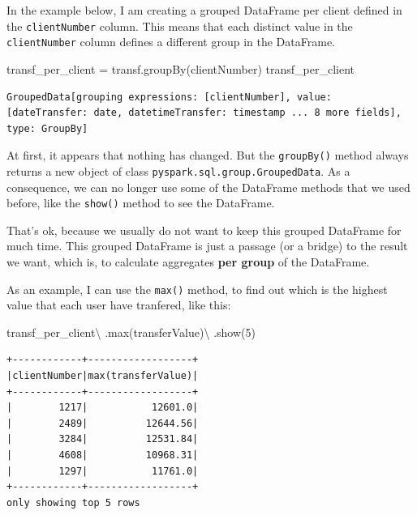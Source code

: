 \documentclass[
  11pt,
  letterpaper,
  DIV=11,
  numbers=noendperiod]{scrreprt}
\newenvironment{Shaded}{\begin{snugshade}}{\end{snugshade}}
\newcommand{\BuiltInTok}[1]{\textcolor[rgb]{0.00,0.23,0.31}{#1}}
\newcommand{\DecValTok}[1]{\textcolor[rgb]{0.68,0.00,0.00}{#1}}
\newcommand{\NormalTok}[1]{\textcolor[rgb]{0.00,0.23,0.31}{#1}}
\newcommand{\OperatorTok}[1]{\textcolor[rgb]{0.37,0.37,0.37}{#1}}
\newcommand{\StringTok}[1]{\textcolor[rgb]{0.13,0.47,0.30}{#1}}
\begin{document}
In the example below, I am creating a grouped DataFrame per client
defined in the \texttt{clientNumber} column. This means that each
distinct value in the \texttt{clientNumber} column defines a different
group in the DataFrame.

\begin{Shaded}
\begin{Highlighting}[]
\NormalTok{transf\_per\_client }\OperatorTok{=}\NormalTok{ transf.groupBy(}\StringTok{\textquotesingle{}clientNumber\textquotesingle{}}\NormalTok{)}
\NormalTok{transf\_per\_client}
\end{Highlighting}
\end{Shaded}

\begin{verbatim}
GroupedData[grouping expressions: [clientNumber], value: [dateTransfer: date, datetimeTransfer: timestamp ... 8 more fields], type: GroupBy]
\end{verbatim}

At first, it appears that nothing has changed. But the
\texttt{groupBy()} method always returns a new object of class
\texttt{pyspark.sql.group.GroupedData}. As a consequence, we can no
longer use some of the DataFrame methods that we used before, like the
\texttt{show()} method to see the DataFrame.

That's ok, because we usually do not want to keep this grouped DataFrame
for much time. This grouped DataFrame is just a passage (or a bridge) to
the result we want, which is, to calculate aggregates \textbf{per group}
of the DataFrame.

As an example, I can use the \texttt{max()} method, to find out which is
the highest value that each user have tranfered, like this:

\begin{Shaded}
\begin{Highlighting}[]
\NormalTok{transf\_per\_client}\OperatorTok{\textbackslash{}}
\NormalTok{  .}\BuiltInTok{max}\NormalTok{(}\StringTok{\textquotesingle{}transferValue\textquotesingle{}}\NormalTok{)}\OperatorTok{\textbackslash{}}
\NormalTok{  .show(}\DecValTok{5}\NormalTok{)}
\end{Highlighting}
\end{Shaded}

\begin{verbatim}
+------------+------------------+
|clientNumber|max(transferValue)|
+------------+------------------+
|        1217|           12601.0|
|        2489|          12644.56|
|        3284|          12531.84|
|        4608|          10968.31|
|        1297|           11761.0|
+------------+------------------+
only showing top 5 rows
\end{verbatim}
\end{document}
